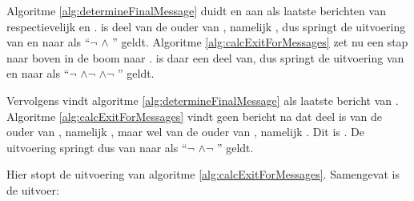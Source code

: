 Algoritme \ref{alg:determineFinalMessage} duidt  en  aan als laatste berichten van respectievelijk  en .  is deel van de ouder van , namelijk , dus springt de uitvoering van  en  naar  als ``$\lnot$ $\land$ '' geldt. Algoritme \ref{alg:calcExitForMessages} zet nu een stap naar boven in de boom naar .  is daar een deel van, dus springt de uitvoering van  en  naar  als ``$\lnot$ $\land \lnot$  $\land \lnot$ '' geldt.

Vervolgens vindt algoritme \ref{alg:determineFinalMessage}  als laatste bericht van . Algoritme \ref{alg:calcExitForMessages} vindt geen bericht na  dat deel is van de ouder van , namelijk , maar wel van de ouder van , namelijk . Dit is . De uitvoering springt dus van  naar  als ``$\lnot$  $\land \lnot$ '' geldt.
 
Hier stopt de uitvoering van algoritme \ref{alg:calcExitForMessages}. Samengevat is de uitvoer: 
 
